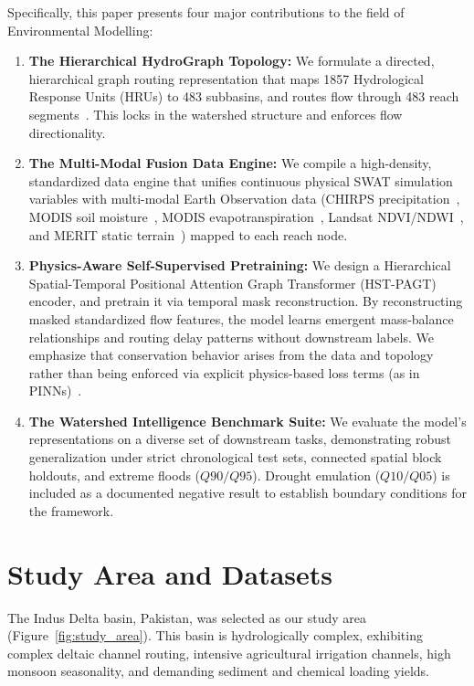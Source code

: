 \documentclass[preprint,12pt]{elsarticle}
\begin{document}
Specifically, this paper presents four major contributions to the field of Environmental Modelling:
\begin{enumerate}
    \item \textbf{The Hierarchical HydroGraph Topology:} We formulate a directed, hierarchical graph routing representation that maps 1857 Hydrological Response Units (HRUs) to 483 subbasins, and routes flow through 483 reach segments~\citep{grill2019global}. This locks in the watershed structure and enforces flow directionality.
    \item \textbf{The Multi-Modal Fusion Data Engine:} We compile a high-density, standardized data engine that unifies continuous physical SWAT simulation variables with multi-modal Earth Observation data (CHIRPS precipitation~\citep{huffman2007trmm}, MODIS soil moisture~\citep{karthikeyan2017review}, MODIS evapotranspiration~\citep{mu2011evapotranspiration}, Landsat NDVI/NDWI~\citep{franke2013landsat, pekeler2016high}, and MERIT static terrain~\citep{farr2007srtm, gorelick2017google}) mapped to each reach node.
    \item \textbf{Physics-Aware Self-Supervised Pretraining:} We design a Hierarchical Spatial-Temporal Positional Attention Graph Transformer (HST-PAGT) encoder, and pretrain it via temporal mask reconstruction. By reconstructing masked standardized flow features, the model learns emergent mass-balance relationships and routing delay patterns without downstream labels. We emphasize that conservation behavior arises from the data and topology rather than being enforced via explicit physics-based loss terms (as in PINNs)~\citep{devlin2018bert, he2022masked, jia2021physics}.
    \item \textbf{The Watershed Intelligence Benchmark Suite:} We evaluate the model's representations on a diverse set of downstream tasks, demonstrating robust generalization under strict chronological test sets, connected spatial block holdouts, and extreme floods ($Q90/Q95$). Drought emulation ($Q10/Q05$) is included as a documented negative result to establish boundary conditions for the framework.
\end{enumerate}

\section{Study Area and Datasets}
The Indus Delta basin, Pakistan, was selected as our study area (Figure~\ref{fig:study_area}). This basin is hydrologically complex, exhibiting complex deltaic channel routing, intensive agricultural irrigation channels, high monsoon seasonality, and demanding sediment and chemical loading yields. 
\end{document}
